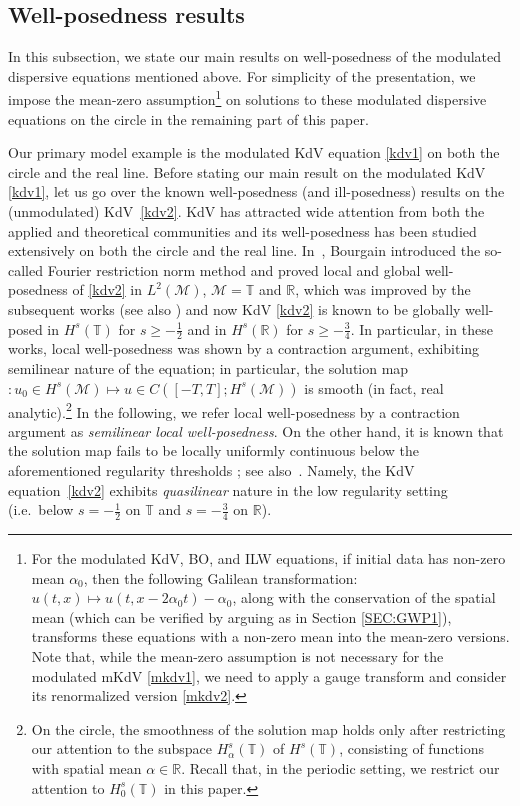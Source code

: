 \documentclass[letterpaper, 11pt,  reqno]{amsart}
\newcommand{\1}{\hspace{0.5mm}\text{I}\hspace{0.5mm}}
\newcommand{\R}{\mathbb{R}}
\newcommand{\T}{\mathbb{T}}
\newcommand{\al}{\alpha}
\newcommand{\M}{\mathcal{M}}
\numberwithin{equation}{section}
\numberwithin{theorem}{section}
\begin{document}
\subsection{Well-posedness results}


In this subsection, 
we state our main results on well-posedness
of the modulated dispersive equations mentioned above.
For simplicity of the presentation, 
we impose
the mean-zero assumption\footnote{For the modulated KdV, BO, and  ILW equations, 
if initial data has non-zero mean $\al_0$, then the following Galilean transformation:
$u(t, x)\mapsto u (t, x - 2\al_0t)-\al_0$, 
along with the conservation of the spatial mean (which can be verified
by arguing as in Section \ref{SEC:GWP1}), 
transforms
these equations with a non-zero mean into the mean-zero versions.
Note that, while  the mean-zero assumption is not necessary
for the modulated mKdV \eqref{mkdv1},
we need to apply a gauge transform and consider its renormalized version \eqref{mkdv2}.
}
 on solutions to
these modulated dispersive equations on the circle
in the remaining part of this paper.




Our primary model example  is the modulated KdV equation \eqref{kdv1}
on both the circle and the real line.
Before stating our main result on the modulated KdV \eqref{kdv1}, 
let us go over the known well-posedness (and ill-posedness) results
on the (unmodulated) KdV~\eqref{kdv2}.
KdV  has attracted wide attention 
from both the applied and theoretical communities
and its well-posedness has been studied
extensively on both the circle and the real line.
In~\cite{BO93}, 
Bourgain introduced the so-called
 Fourier restriction norm method
and proved local and global well-posedness of \eqref{kdv2}
in $L^2(\M)$, $\M = \T$ and $\R$,
which was
improved
by the subsequent works
\cite{KPV96, CKSTT03, Ki09, G09}
(see also \cite{BK})
and now KdV \eqref{kdv2}
is known to be 
globally well-posed
in $H^s(\T)$ for $s \ge - \frac 12$
and in $H^{s}(\R)$ for $s \ge -\frac 34$.
In particular, in these works, 
local well-posedness was shown by a contraction argument, 
exhibiting semilinear nature of the equation;
in particular, the solution map$: u_0\in H^s(\M)\mapsto u\in C([-T, T]; H^s(\M))$
is smooth (in fact, real analytic).\footnote{On the circle, 
the smoothness of the solution map holds
only after  restricting our attention to the subspace 
$H^s_\al(\T)$
of $H^s(\T)$, 
consisting of functions with spatial mean $\al \in \R$.
Recall that, in the periodic setting,  we restrict our attention to $H^s_0(\T)$
in this paper.}
In the following, we refer local well-posedness
by a contraction argument 
as {\it semilinear local well-posedness}.
On the other hand, it is known that the solution map
fails to be locally 
uniformly continuous below the aforementioned regularity thresholds
\cite{CCT}; see also~\cite{BO97}.
Namely,  the KdV equation~\eqref{kdv2} exhibits 
{\it quasilinear} nature in the low regularity setting
(i.e.~below $s = -\frac 12$ on $\T$
and $s=- \frac 34$ on $\R$). 
\end{document}
